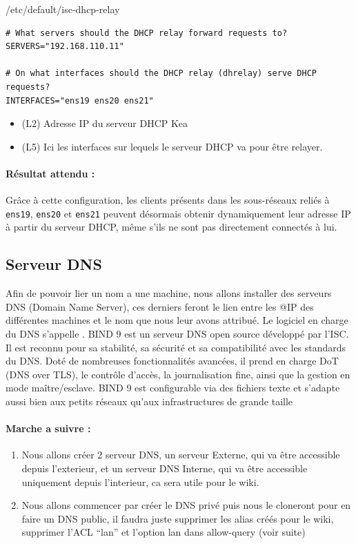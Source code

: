 \documentclass{article}
\begin{document}
\begin{configbox}{/etc/default/isc-dhcp-relay}
\begin{lstlisting}
# What servers should the DHCP relay forward requests to?
SERVERS="192.168.110.11"

# On what interfaces should the DHCP relay (dhrelay) serve DHCP requests?
INTERFACES="ens19 ens20 ens21"
\end{lstlisting}
\end{configbox}

\begin{itemize}
	\item (L2) Adresse IP du serveur DHCP Kea
	\item (L5) Ici les interfaces sur lequels le serveur DHCP va pour être relayer.
\end{itemize}

\paragraph{Résultat attendu :}
Grâce à cette configuration, les clients présents dans les sous-réseaux reliés à \texttt{ens19}, \texttt{ens20} et \texttt{ens21} peuvent désormais obtenir dynamiquement leur adresse IP à partir du serveur DHCP, même s’ils ne sont pas directement connectés à lui.

\subsection{Serveur DNS}
Afin de pouvoir lier un nom a une machine, nous allons installer des serveurs DNS (Domain Name Server), ces derniers feront le lien entre les @IP des différentes machines et le nom que nous leur avons attribué. Le logiciel en charge du DNS s'appelle . BIND 9 est un serveur DNS open source développé par l’ISC. Il est reconnu pour sa stabilité, sa sécurité et sa compatibilité avec les standards du DNS. Doté de nombreuses fonctionnalités avancées, il prend en charge DoT (DNS over TLS), le contrôle d’accès, la journalisation fine, ainsi que la gestion en mode maître/esclave. BIND 9 est configurable via des fichiers texte et s’adapte aussi bien aux petits réseaux qu’aux infrastructures de grande taille

\paragraph{Marche a suivre :}
\begin{enumerate}
	\item Nous allons créer 2 serveur DNS, un serveur Externe, qui va être accessible depuis l’exterieur, et un serveur DNS Interne, qui va être accessible uniquement depuis l’interieur, ca sera utile pour le wiki. 
	\item Nous allons commencer par créer le DNS privé puis nous le cloneront pour en faire un DNS public, il faudra juste supprimer les alias créés pour le wiki, supprimer l’ACL “lan” et l’option lan dans allow-query (voir suite)
\end{enumerate}
\end{document}
